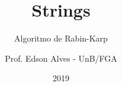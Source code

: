 \title{Strings}
\subtitle{Algoritmo de Rabin-Karp}
\author{Prof. Edson Alves - UnB/FGA}
\date{2019}
